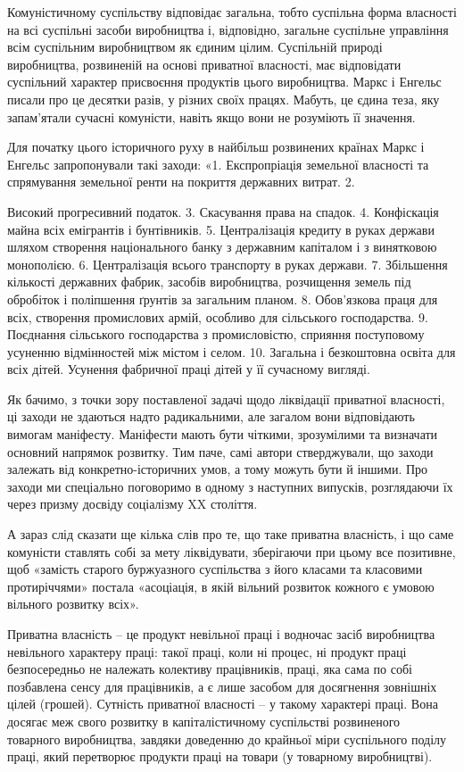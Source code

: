 \documentclass[../main]{subfiles}
\begin{document}
Комуністичному суспільству відповідає загальна, тобто суспільна форма власності на всі суспільні засоби виробництва і, відповідно, загальне суспільне управління всім суспільним виробництвом як єдиним цілим. Суспільній природі виробництва, розвиненій на основі приватної власності, має відповідати суспільний характер присвоєння продуктів цього виробництва. Маркс і Енгельс писали про це десятки разів, у різних своїх працях. Мабуть, це єдина теза, яку запам’ятали сучасні комуністи, навіть якщо вони не розуміють її значення.

Для початку цього історичного руху в найбільш розвинених країнах Маркс і Енгельс запропонували такі заходи: «1. Експропріація земельної власності та спрямування земельної ренти на покриття державних витрат. 2.

Високий прогресивний податок. 3. Скасування права на спадок. 4. Конфіскація майна всіх емігрантів і бунтівників. 5. Централізація кредиту в руках держави шляхом створення національного банку з державним капіталом і з винятковою монополією. 6. Централізація всього транспорту в руках держави. 7. Збільшення кількості державних фабрик, засобів виробництва, розчищення земель під обробіток і поліпшення ґрунтів за загальним планом. 8. Обов’язкова праця для всіх, створення промислових армій, особливо для сільського господарства. 9. Поєднання сільського господарства з промисловістю, сприяння поступовому усуненню відмінностей між містом і селом. 10. Загальна і безкоштовна освіта для всіх дітей. Усунення фабричної праці дітей у її сучасному вигляді.

Як бачимо, з точки зору поставленої задачі щодо ліквідації приватної власності, ці заходи не здаються надто радикальними, але загалом вони відповідають вимогам маніфесту. Маніфести мають бути чіткими, зрозумілими та визначати основний напрямок розвитку. Тим паче, самі автори стверджували, що заходи залежать від конкретно-історичних умов, а тому можуть бути й іншими. Про заходи ми спеціально поговоримо в одному з наступних випусків, розглядаючи їх через призму досвіду соціалізму XX століття.

А зараз слід сказати ще кілька слів про те, що таке приватна власність, і що саме комуністи ставлять собі за мету ліквідувати, зберігаючи при цьому все позитивне, щоб «замість старого буржуазного суспільства з його класами та класовими протиріччями» постала «асоціація, в якій вільний розвиток кожного є умовою вільного розвитку всіх».

Приватна власність – це продукт невільної праці і водночас засіб виробництва невільного характеру праці: такої праці, коли ні процес, ні продукт праці безпосередньо не належать колективу працівників, праці, яка сама по собі позбавлена сенсу для працівників, а є лише засобом для досягнення зовнішніх цілей (грошей). Сутність приватної власності – у такому характері праці. Вона досягає меж свого розвитку в капіталістичному суспільстві розвиненого товарного виробництва, завдяки доведенню до крайньої міри суспільного поділу праці, який перетворює продукти праці на товари (у товарному виробництві).
\end{document}

